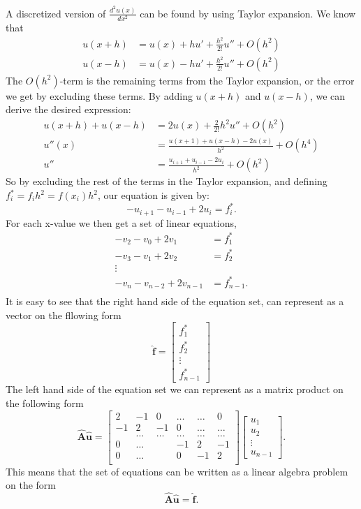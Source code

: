 \documentclass[a4paper,10pt]{article}
\newcommand{\dder}[2]{\frac{d^2 #1}{d #2 ^2}}
\begin{document}
A discretized version of $\dder{u(x)}{x}$ can be found by using Taylor expansion. We know that
\begin{align*}
u(x + h) &= u(x) + h u' + \frac{h^2}{2!} u'' + O(h^2) \\
u(x - h) &= u(x) - h u' + \frac{h^2}{2!} u'' + O(h^2) 
\end{align*} 
The $O(h^2)$-term is the remaining terms from the Taylor expansion, or the error we get by excluding these terms. By adding $u(x + h)$ and $u(x-h)$, we can derive the desired expression:
\begin{align*}
u(x + h) + u(x - h) &= 2 u(x) + \frac{2}{2!} h^2 u'' + O(h^2) \\
u''(x) &= \frac{u(x+1) + u(x-h) - 2u(x)}{h^2} + O(h^4) \\
u'' &=  \frac{u_{i+1} + u_{i-1} - 2u_i}{h^2}+ O(h^2)
\end{align*}
So by excluding the rest of the terms in the Taylor expansion, and defining $f_i^* = f_i h^2= f(x_i) h^2 $, our equation is given by:
$$- u_{i+1} - u_{i-1} + 2u_i = f_i^* .$$ 
For each x-value we then get a set of linear equations, 
\begin{align*}
-v_2 - v_0 + 2v_1 &= f_1^*  \\
-v_3 - v_1 + 2v_2 &= f_2^*\\
\vdots \\
-v_n - v_{n-2} + 2v_{n-1} &= f_{n-1}^*. \\
\end{align*}
It is easy to see that the right hand side of the equation set, can represent as a vector on the fllowing form
$$ \mathbf{\hat{f}} =  
\begin{bmatrix}
	 f_1^*\\
          f_2^* \\
   	\vdots \\
 	f_{n-1}^* 
\end{bmatrix} $$
The left hand side of the equation set we can represent as a matrix product on the following form
$$
\mathbf{\hat{A}} \mathbf{\hat{u}} = 
\begin{bmatrix}
                           2& -1& 0 &\dots   & \dots &0 \\
                           -1 & 2 & -1 &0 &\dots &\dots \\
                           & \dots   & \dots &\dots   &\dots & \dots \\
                           0&\dots   &  &-1 &2& -1 \\
                           0&\dots    &  & 0  &-1 & 2 \\
\end{bmatrix}
\begin{bmatrix}
	 u_1\\
          u_2 \\
   	\vdots \\
 	u_{n-1}
\end{bmatrix}.
$$
This means that the set of equations can be written as a linear algebra problem on the form
$$ \mathbf{\hat{A}} \mathbf{\hat{u}} = \mathbf{\hat{f}}.$$
\end{document}
